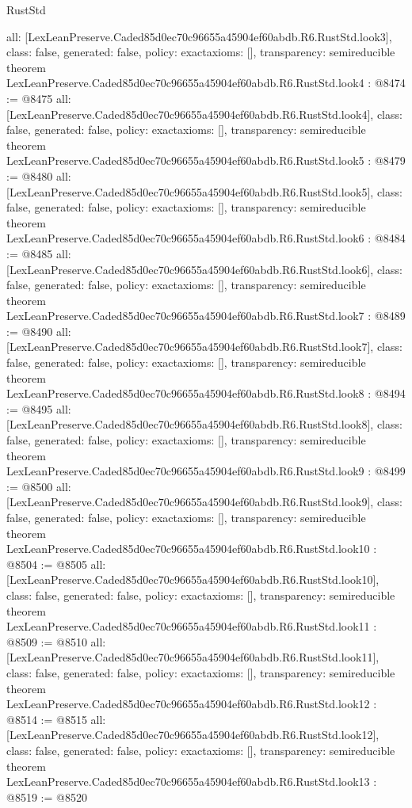 \begin{lexlean}{RustStd}
\begin{coremodule}
{  all: [LexLeanPreserve.Caded85d0ec70c96655a45904ef60abdb.R6.RustStd.look3],
  class: false,
  generated: false,
  policy: exact{axioms: []},
  transparency: semireducible
}
theorem LexLeanPreserve.Caded85d0ec70c96655a45904ef60abdb.R6.RustStd.look4 : @8474 := @8475 {
  all: [LexLeanPreserve.Caded85d0ec70c96655a45904ef60abdb.R6.RustStd.look4],
  class: false,
  generated: false,
  policy: exact{axioms: []},
  transparency: semireducible
}
theorem LexLeanPreserve.Caded85d0ec70c96655a45904ef60abdb.R6.RustStd.look5 : @8479 := @8480 {
  all: [LexLeanPreserve.Caded85d0ec70c96655a45904ef60abdb.R6.RustStd.look5],
  class: false,
  generated: false,
  policy: exact{axioms: []},
  transparency: semireducible
}
theorem LexLeanPreserve.Caded85d0ec70c96655a45904ef60abdb.R6.RustStd.look6 : @8484 := @8485 {
  all: [LexLeanPreserve.Caded85d0ec70c96655a45904ef60abdb.R6.RustStd.look6],
  class: false,
  generated: false,
  policy: exact{axioms: []},
  transparency: semireducible
}
theorem LexLeanPreserve.Caded85d0ec70c96655a45904ef60abdb.R6.RustStd.look7 : @8489 := @8490 {
  all: [LexLeanPreserve.Caded85d0ec70c96655a45904ef60abdb.R6.RustStd.look7],
  class: false,
  generated: false,
  policy: exact{axioms: []},
  transparency: semireducible
}
theorem LexLeanPreserve.Caded85d0ec70c96655a45904ef60abdb.R6.RustStd.look8 : @8494 := @8495 {
  all: [LexLeanPreserve.Caded85d0ec70c96655a45904ef60abdb.R6.RustStd.look8],
  class: false,
  generated: false,
  policy: exact{axioms: []},
  transparency: semireducible
}
theorem LexLeanPreserve.Caded85d0ec70c96655a45904ef60abdb.R6.RustStd.look9 : @8499 := @8500 {
  all: [LexLeanPreserve.Caded85d0ec70c96655a45904ef60abdb.R6.RustStd.look9],
  class: false,
  generated: false,
  policy: exact{axioms: []},
  transparency: semireducible
}
theorem LexLeanPreserve.Caded85d0ec70c96655a45904ef60abdb.R6.RustStd.look10 : @8504 := @8505 {
  all: [LexLeanPreserve.Caded85d0ec70c96655a45904ef60abdb.R6.RustStd.look10],
  class: false,
  generated: false,
  policy: exact{axioms: []},
  transparency: semireducible
}
theorem LexLeanPreserve.Caded85d0ec70c96655a45904ef60abdb.R6.RustStd.look11 : @8509 := @8510 {
  all: [LexLeanPreserve.Caded85d0ec70c96655a45904ef60abdb.R6.RustStd.look11],
  class: false,
  generated: false,
  policy: exact{axioms: []},
  transparency: semireducible
}
theorem LexLeanPreserve.Caded85d0ec70c96655a45904ef60abdb.R6.RustStd.look12 : @8514 := @8515 {
  all: [LexLeanPreserve.Caded85d0ec70c96655a45904ef60abdb.R6.RustStd.look12],
  class: false,
  generated: false,
  policy: exact{axioms: []},
  transparency: semireducible
}
theorem LexLeanPreserve.Caded85d0ec70c96655a45904ef60abdb.R6.RustStd.look13 : @8519 := @8520 {
}
\end{coremodule}
\end{lexlean}
